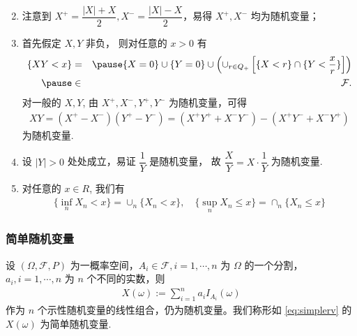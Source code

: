 \documentclass[Prob-All.tex]{subfiles}
\begin{document}
\begin{frame}
	\vspace{0.6cm}
	\begin{enumerate}[<+-|alert@+>]
		\setcounter{enumi}{1}
		\item 注意到 $X^+=\dfrac{|X|+X}{2}, X^-=\dfrac{|X|-X}{2}$，易得 $X^+,X^-$ 均为随机变量；
		\item 首先假定 $X,Y$ 非负， 则对任意的 $x>0$ 有
		      \begin{eqnarray*}
			      \{XY<x\}&=&\pause \{X=0\}\cup \{Y=0\}\cup \left(\cup_{r\in Q_+}\left[\{X<r\}\cap \{Y<\frac{x}{r}\}\right]\right)\\ \pause
			      &\in&\mathcal{F}.
		      \end{eqnarray*}
		      \pause
		      对一般的 $X,Y$, 由 $X^+,X^-,Y^+,Y^-$ 为随机变量，可得
		      \begin{eqnarray*}
			      XY=(X^+-X^-)(Y^+-Y^-)=(X^+Y^++X^-Y^-)-(X^+Y^-+X^-Y^+)
		      \end{eqnarray*}
		      为随机变量.
		\item 设 $|Y|>0$ 处处成立，易证 $\dfrac{1}{Y}$ 是随机变量， 故 $\dfrac{X}{Y}=X\cdot \dfrac{1}{Y}$ 为随机变量.
		\item 对任意的 $x\in R$, 我们有
		      \begin{eqnarray*}
			      \{\inf_nX_n<x\}=\cup_n\{X_n<x\}, \quad \{\sup_nX_n\le x\}=\cap_n\{X_n\le x\}
		      \end{eqnarray*}

	\end{enumerate}


\end{frame}

\begin{frame}
	\frametitle{简单随机变量}
	\begin{exam}
		设 $(\Omega,\mathcal{F},P)$ 为一概率空间，$A_i\in\mathcal{F}, i=1,\cdots,n$ 为 $\Omega$ 的一个分割，$a_i,i=1,\cdots, n$ 为 $n$ 个不同的实数，则
		\begin{eqnarray}\label{eq:simplerv}
			X(\omega):=\sum_{i=1}^na_iI_{A_i}(\omega)
		\end{eqnarray}
		作为 $n$ 个示性随机变量的线性组合，仍为随机变量。我们称形如 \eqref{eq:simplerv} 的 $X (\omega)$ 为简单随机变量.
	\end{exam}

\end{frame}
\end{document}
